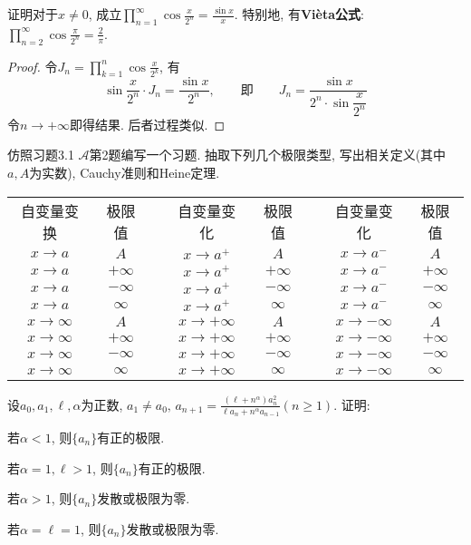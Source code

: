 \begin{quizb}
\woe 证明对于\(x\ne 0\), 成立\(\prod_{n=1}^{\infty}\cos\frac{x}{2^n}=\frac{\sin x}{x}\). 特别地, 有\textbf{Vi\`{e}ta公式}: \(\prod_{n=2}^{\infty}\cos\frac{\pi}{2^n}=\frac{2}{\pi}\).
\begin{proof}
令\(J_n=\prod_{k=1}^{n}\cos\frac{x}{2^k}\), 有\[\sin\frac{x}{2^n}\cdot J_n=\frac{\sin x}{2^n},\qquad\text{即}\qquad J_n=\frac{\sin x}{2^n\cdot\sin\dfrac{x}{2^n}}\]令\(n\rightarrow+\infty\)即得结果. 后者过程类似.
\end{proof}
\woe 仿照习题3.1 \(\boldsymbol{\mathcal{A}}\)第2题编写一个习题.
\woe 抽取下列几个极限类型, 写出相关定义(其中\(a,A\)为实数), Cauchy准则和Heine定理.
\begin{table}[H]
    \centering
    \begin{tabular}{|c|c|c|c|c|c|c|c|}
        \hline
        自变量变换&极限值&&自变量变化&极限值&&自变量变化&极限值\\\cline{1-2}\cline{4-5}\cline{7-8}
         \(x\rightarrow a\)&\(A\)&&\(x\rightarrow a^+\)&\(A\)&&\(x\rightarrow a^-\)&\(A\)\\\cline{1-2}\cline{4-5}\cline{7-8}
         \(x\rightarrow a\)&\(+\infty\)&&\(x\rightarrow a^+\)&\(+\infty\)&&\(x\rightarrow a^-\)&\(+\infty\)\\\cline{1-2}\cline{4-5}\cline{7-8}
         \(x\rightarrow a\)&\(-\infty\)&&\(x\rightarrow a^+\)&\(-\infty\)&&\(x\rightarrow a^-\)&\(-\infty\)\\\cline{1-2}\cline{4-5}\cline{7-8}
         \(x\rightarrow a\)&\(\infty\)&&\(x\rightarrow a^+\)&\(\infty\)&&\(x\rightarrow a^-\)&\(\infty\)\\\cline{1-2}\cline{4-5}\cline{7-8}
         \(x\rightarrow \infty\)&\(A\)&&\(x\rightarrow +\infty\)&\(A\)&&\(x\rightarrow -\infty\)&\(A\)\\\cline{1-2}\cline{4-5}\cline{7-8}
         \(x\rightarrow \infty\)&\(+\infty\)&&\(x\rightarrow +\infty\)&\(+\infty\)&&\(x\rightarrow -\infty\)&\(+\infty\)\\\cline{1-2}\cline{4-5}\cline{7-8}
         \(x\rightarrow \infty\)&\(-\infty\)&&\(x\rightarrow +\infty\)&\(-\infty\)&&\(x\rightarrow -\infty\)&\(-\infty\)\\\cline{1-2}\cline{4-5}\cline{7-8}
         \(x\rightarrow \infty\)&\(\infty\)&&\(x\rightarrow +\infty\)&\(\infty\)&&\(x\rightarrow -\infty\)&\(\infty\)\\\hline
    \end{tabular}
\end{table}
\woe 设\(a_0,a_1,\ell,\alpha\)为正数, \(a_1\ne a_0,\,a_{n+1}=\frac{(\ell+n^\alpha)a_n^2}{\ell a_n+n^\alpha a_{n-1}}(n\geqslant 1)\). 证明:
\begin{quizcs}
\item 若\(\alpha<1\), 则\(\{a_n\}\)有正的极限.
\item 若\(\alpha=1, \ell>1\), 则\(\{a_n\}\)有正的极限.
\item 若\(\alpha>1\), 则\(\{a_n\}\)发散或极限为零.
\item 若\(\alpha=\ell=1\), 则\(\{a_n\}\)发散或极限为零.
\end{quizcs}
\end{quizb}
